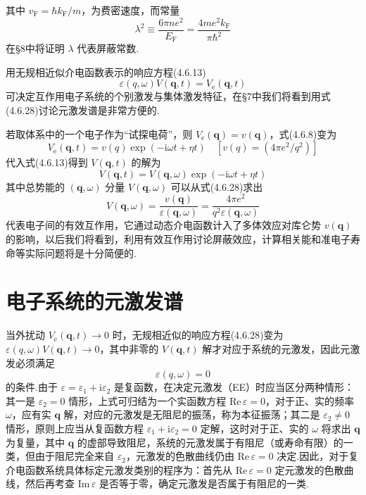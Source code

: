 其中 $v_{\mathrm{F}}=\hbar k_{\mathrm{F}}/m$，为费密速度，而常量
\begin{equation}
  \lambda^{2}\equiv\frac{6\pi ne^{2}}{E_{\mathrm{F}}}
  =\frac{4me^{2}k_{\mathrm{F}}}{\pi\hbar^{2}}
\end{equation}
在§8中将证明 $\lambda$ 代表屏蔽常数.

用无规相近似介电函数表示的响应方程(4.6.13)
\begin{equation}
  \varepsilon(q,\omega)V(\boldsymbol{q},t)=V_{\mathrm{e}}(\boldsymbol{q},t)
\end{equation}
可决定互作用电子系统的个别激发与集体激发特征，在§7中我们将看到用式(4.6.28)讨论元激发谱是非常方便的.

若取体系中的一个电子作为“试探电荷”，则 $V_{\mathrm{e}}(\boldsymbol{q})=v(\boldsymbol{q})$，式(4.6.8)变为
\begin{equation*}
  V_{\mathrm{e}}(\boldsymbol{q},t)=v(q)\exp\left(-\mathrm{i}\omega t+\eta t\right)
  \quad\left[v(q)=\left(4\pi e^{2}/q^{2}\right)\right]
\end{equation*}
代入式(4.6.13)得到 $V(\boldsymbol{q},t)$ 的解为
\begin{equation}
  V(\boldsymbol{q},t)=V(\boldsymbol{q},\omega)
  \exp\left(-\mathrm{i}\omega t+\eta t\right)
\end{equation}
其中总势能的 $(\boldsymbol{q},\omega)$ 分量 $V(\boldsymbol{q},\omega)$ 可以从式(4.6.28)求出
\begin{equation}
  V(\boldsymbol{q},\omega)=\frac{v(\boldsymbol{q})}{\varepsilon(\boldsymbol{q},\omega)}
  =\frac{4\pi e^{2}}{q^{2}\varepsilon(\boldsymbol{q},\omega)}
\end{equation}
代表电子间的有效互作用，它通过动态介电函数计入了多体效应对库仑势 $v(\boldsymbol{q})$ 的影响，以后我们将看到，利用有效互作用讨论屏蔽效应，计算相关能和准电子寿命等实际问题将是十分简便的.

\section{电子系统的元激发谱}

当外扰动 $V_{\mathrm{e}}(\boldsymbol{q},t)\to 0$ 时，无规相近似的响应方程(4.6.28)变为 $\varepsilon(q,\omega)V(\boldsymbol{q},t)\to 0$，其中非零的 $V(\boldsymbol{q},t)$ 解才对应于系统的元激发，因此元激发必须满足
\begin{equation*}
  \varepsilon(q,\omega)=0
\end{equation*}
的条件.由于 $\varepsilon=\varepsilon_{1}+\mathrm{i}\varepsilon_{2}$ 是复函数，在决定元激发（EE）时应当区分两种情形：其一是 $\varepsilon_{2}=0$ 情形，上式可归结为一个实函数方程 $\mathrm{Re}\,\varepsilon=0$，对于正、实的频率 $\omega$，应有实 $\boldsymbol{q}$ 解，对应的元激发是无阻尼的振荡，称为本征振荡；其二是 $\varepsilon_{2}\neq 0$ 情形，原则上应当从复函数方程 $\varepsilon_{1}+\mathrm{i}\varepsilon_{2}=0$ 定解，这时对于正、实的 $\omega$ 将求出 $\boldsymbol{q}$ 为复量，其中 $\boldsymbol{q}$ 的虚部导致阻尼，系统的元激发属于有阻尼（或寿命有限）的一类，但由于阻尼完全来自 $\varepsilon_{2}$，元激发的色散曲线仍由 $\mathrm{Re}\,\varepsilon=0$ 决定.因此，对于复介电函数系统具体标定元激发类别的程序为：首先从 $\mathrm{Re}\,\varepsilon=0$ 定元激发的色散曲线，然后再考查 $\mathrm{Im}\,\varepsilon$ 是否等于零，确定元激发是否属于有阻尼的一类.

